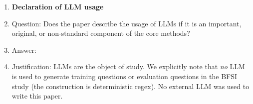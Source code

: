 \documentclass{article}
\begin{document}
\begin{enumerate}
\item {\bf Declaration of LLM usage}
    \item[] Question: Does the paper describe the usage of LLMs if it is an important, original, or non-standard component of the core methods?
    \item[] Answer: \answerYes{}
    \item[] Justification: LLMs are the object of study. We explicitly note that \emph{no} LLM is used to generate training questions or evaluation questions in the BFSI study (the construction is deterministic regex). No external LLM was used to write this paper.

\end{enumerate}
\end{document}
